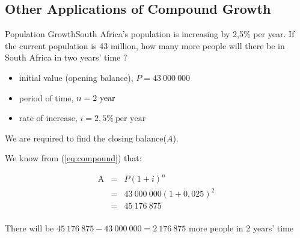 \documentclass[10pt,a4paper,titlepage,twoside,openright]{report}
\begin{document}
\subsection{Other Applications of Compound Growth}

\begin{wex}{Population Growth}{South Africa's population is increasing by 2,5\% per year.  If the current population is 43 million, how many more people will there be in South Africa in two years' time ?}{
\begin{itemize}[topsep=0ex, partopsep=\parskip,itemsep=\parskip]
\item{initial value (opening balance), $P=43~000~000$}
\item{period of time, $n=2~\rm{year}$}
\item{rate of increase, $i=2,5\%~\mbox{per year}$}
\end{itemize}
\vspace{0.5cm}
We are required to find the closing balance($A$). 

We know from (\ref{eq:compound}) that:

\begin{eqnarray*}
\mbox{A}&=& P (1 + i)^n\\
&=& 43~000~000(1 + 0,025)^{2}\\
&=& 45~176~875\\
\end{eqnarray*}

There will be  $45~176~875 - 43~000~000 = 2~176~875$ more people in 2 years' time
}
\end{wex}
\end{document}
